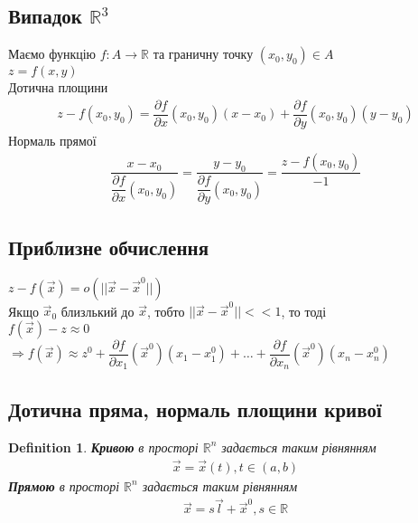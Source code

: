 \documentclass[a4paper, 14pt]{extarticle}
\def\departial#1#2{\dfrac{\partial {#1}}{\partial {#2}}}
\def\bigline{\vspace{5mm}\\}
\theoremstyle{theoremdd}
\theoremstyle{theoremdd}
\newtheorem{definition}[theorem]{Definition}
\theoremstyle{theoremdd}
\theoremstyle{theoremdd}
\theoremstyle{theoremdd}
\theoremstyle{theoremdd}
\theoremstyle{theoremdd}
\begin{document}
\subsection*{Випадок $\mathbb{R}^3$}
Маємо функцію $f: A \to \mathbb{R}$ та граничну точку $(x_0,y_0) \in A$\\
$z = f(x,y)$\\
Дотична площини
\begin{align*}
z - f(x_0,y_0) = \departial{f}{x}(x_0,y_0)(x-x_0)+\departial{f}{y}(x_0,y_0)(y-y_0)
\end{align*}
Нормаль прямої
\begin{align*}
\dfrac{x-x_0}{\departial{f}{x}(x_0,y_0)} = \dfrac{y-y_0}{\departial{f}{y}(x_0,y_0)} = \dfrac{z-f(x_0,y_0)}{-1}
\end{align*}

\iffalse
\begin{figure}[H]
\centering
\begin{tikzpicture}[scale=1.5]
\begin{axis}[axis lines = center, axis on top, axis line style = {thick, black}]
\addplot3[surf, domain=-1:4, y domain=0:2, red, opacity = 0.5]{-2+2*x+2*y};
\addplot3[surf, domain=-1:4, y domain=0:2, blue, opacity = 0.5]{x^(2) * y^(2)};
\addplot3+[no markers,samples=51, domain=-1:1,variable=\t]
                                      ({1+2*\t},{2-\t},{1+2*\t});
\end{axis}
\end{tikzpicture}
\end{figure}
\fi


\subsection{Приблизне обчислення}
$z-f(\vec{x}) = o(||\vec{x}-\vec{x}^0||)$\\
Якщо $\vec{x}_0$ близлький до $\vec{x}$, тобто $||\vec{x} - \vec{x}^0|| << 1$, то тоді\\
$f(\vec{x})-z \approx 0$\\
$\Rightarrow f(\vec{x}) \approx z^0 + \departial{f}{x_1}(\vec{x}^0)(x_1-x_1^0) + \dots + \departial{f}{x_n}(\vec{x}^0)(x_n-x_n^0)$
\bigline
\subsection{Дотична пряма, нормаль площини кривої}
\begin{definition}
\textbf{Кривою} в просторі $\mathbb{R}^n$ задається таким рівнянням
\begin{align*}
\vec{x} = \vec{x}(t), t \in (a,b)
\end{align*}
\textbf{Прямою} в просторі $\mathbb{R}^n$ задається таким рівнянням
\begin{align*}
\vec{x} = s \vec{l} + \vec{x}^0, s \in \mathbb{R}
\end{align*}
\end{definition}
\end{document}
